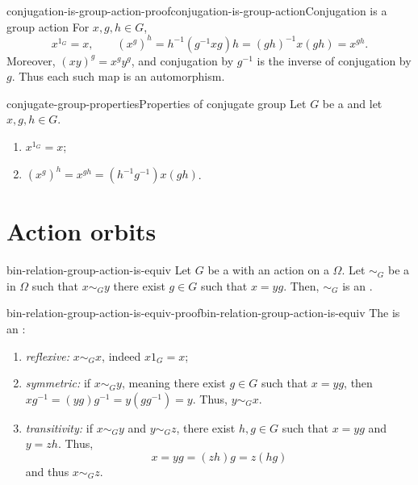 \documentclass[preview]{standalone}
\begin{document}
\begin{snippetproof}{conjugation-is-group-action-proof}{conjugation-is-group-action}{Conjugation is a group action}
    For \(x,g,h\in G\),
    \[
        x^{1_G}=x,
        \qquad (x^g)^h=h^{-1}(g^{-1}xg)h=(gh)^{-1}x(gh)=x^{gh}.
    \]
    Moreover, \((xy)^g=x^gy^g\), and conjugation by \(g^{-1}\) is the
    inverse of conjugation by \(g\). Thus each such map is an automorphism.
\end{snippetproof}

\begin{snippetproposition}{conjugate-group-properties}{Properties of conjugate group}
    Let \(G\) be a \group and let \(x,g,h\in G\).
    \begin{enumerate}
        \item \(x^{1_G} = x\);
        \item \({(x^g)}^h = x^{gh}=(h^{-1}g^{-1})x(gh)\).
    \end{enumerate}
\end{snippetproposition}

\section{Action orbits}

\begin{snippetproposition}{bin-relation-group-action-is-equiv}{}
    Let \(G\) be a \group with an action on a \set \(\Omega\).
    Let \(\sim_G\) be a \binrelation in \(\Omega\) such that
    \(x \sim_G y\) \ifandonlyif there exist \(g\in G\)
    such that \(x=yg\). Then, \(\sim_G\) is an \equivrelation.
\end{snippetproposition}

\begin{snippetproof}{bin-relation-group-action-is-equiv-proof}{bin-relation-group-action-is-equiv}{}
    The \binrelation is an \equivrelation:
    \begin{enumerate}
        \item \emph{reflexive:} \(x \sim_G x\), indeed \(x1_G = x\);
        \item \emph{symmetric:} if \(x \sim_G y\), meaning there exist \(g\in G\)
        such that \(x=yg\), then \(xg^{-1} = (yg)g^{-1} = y(gg^{-1}) = y\).
        Thus, \(y \sim_G x\).
        \item \emph{transitivity:} if \(x \sim_G y\) and \(y\sim_G z\),
        there exist \(h,g \in G\) such that \(x=yg\) and \(y=zh\).
        Thus,
        \[
            x = yg = (zh)g = z(hg)
        \]
        and thus \(x \sim_G z\).
    \end{enumerate}
\end{snippetproof}
\end{document}

